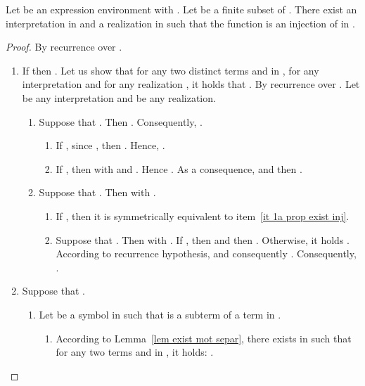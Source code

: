 \documentclass[a4paper]{llncs}
\begin{document}
    \begin{proposition}\label{prop exist inj cas binaire}
    Let  be an expression environment with . Let  be a finite subset of .
    There exist  an interpretation in  and  a realization in  such that the function  is an injection of  in .
  \end{proposition}
  \begin{proof}
    By recurrence over .
    
    \begin{enumerate}
      \item  If  then . Let us show that for any two distinct terms  and  in , for any interpretation  and for any realization , it holds that .     
    By recurrence over . Let  be any interpretation and  be any realization.
    
    \begin{enumerate}
      \item\label{it 1a prop exist inj} Suppose that . Then . Consequently, .
    
      \begin{enumerate}
        \item If , since , then . Hence, .
    
        \item If , then  with  and . Hence . As a consequence,   and then .
      \end{enumerate}
    
    \item  Suppose that . Then  with .
    
      \begin{enumerate}
        \item If , then it is symmetrically equivalent to item~\ref{it 1a prop exist inj}.
    
        \item Suppose that . Then  with . 
    If , then  and then .
    Otherwise, it holds . According to recurrence hypothesis,  and consequently . Consequently, .
      \end{enumerate}
    \end{enumerate}
    
    \item Suppose that .
    
    \begin{enumerate}
      \item Let  be a symbol in  such that  is a subterm of a term in . 
    
      \begin{enumerate}
        \item\label{it 2ai prop exist inj} According to Lemma~\ref{lem exist mot separ}, there exists  in  such that for any two terms  and  in , it holds: .


\end{enumerate}
\end{enumerate}
\end{enumerate}
\end{proof}
\end{document}
